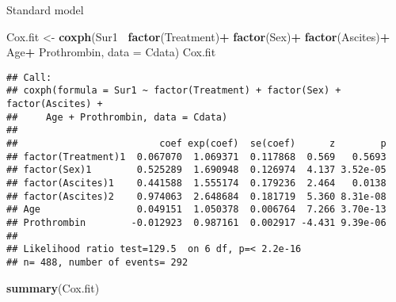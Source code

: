 \documentclass[
]{article}
\newenvironment{Shaded}{\begin{snugshade}}{\end{snugshade}}
\newcommand{\DataTypeTok}[1]{\textcolor[rgb]{0.13,0.29,0.53}{#1}}
\newcommand{\KeywordTok}[1]{\textcolor[rgb]{0.13,0.29,0.53}{\textbf{#1}}}
\newcommand{\NormalTok}[1]{#1}
\newcommand{\OperatorTok}[1]{\textcolor[rgb]{0.81,0.36,0.00}{\textbf{#1}}}
\newcommand{\StringTok}[1]{\textcolor[rgb]{0.31,0.60,0.02}{#1}}
\begin{document}
Standard model

\begin{Shaded}
\begin{Highlighting}[]
\NormalTok{Cox.fit <-}\StringTok{ }\KeywordTok{coxph}\NormalTok{(Sur1}\OperatorTok{~}\StringTok{ }\KeywordTok{factor}\NormalTok{(Treatment)}\OperatorTok{+}\StringTok{ }\KeywordTok{factor}\NormalTok{(Sex)}\OperatorTok{+}\StringTok{ }\KeywordTok{factor}\NormalTok{(Ascites)}\OperatorTok{+}\StringTok{ }\NormalTok{Age}\OperatorTok{+}\StringTok{ }\NormalTok{Prothrombin, }\DataTypeTok{data =}\NormalTok{ Cdata)}
\NormalTok{Cox.fit}
\end{Highlighting}
\end{Shaded}

\begin{verbatim}
## Call:
## coxph(formula = Sur1 ~ factor(Treatment) + factor(Sex) + factor(Ascites) + 
##     Age + Prothrombin, data = Cdata)
## 
##                         coef exp(coef)  se(coef)      z        p
## factor(Treatment)1  0.067070  1.069371  0.117868  0.569   0.5693
## factor(Sex)1        0.525289  1.690948  0.126974  4.137 3.52e-05
## factor(Ascites)1    0.441588  1.555174  0.179236  2.464   0.0138
## factor(Ascites)2    0.974063  2.648684  0.181719  5.360 8.31e-08
## Age                 0.049151  1.050378  0.006764  7.266 3.70e-13
## Prothrombin        -0.012923  0.987161  0.002917 -4.431 9.39e-06
## 
## Likelihood ratio test=129.5  on 6 df, p=< 2.2e-16
## n= 488, number of events= 292
\end{verbatim}

\begin{Shaded}
\begin{Highlighting}[]
\KeywordTok{summary}\NormalTok{(Cox.fit)}
\end{Highlighting}
\end{Shaded}
\end{document}
